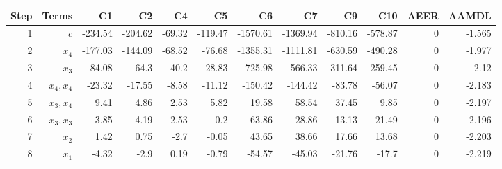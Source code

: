 \begin{tabular}{rrrrrrrrrrrr}
Step & Terms & C1 & C2 & C4 & C5 & C6 & C7 & C9 & C10 & AEER & AAMDL \\ 
\hline 
1 & $c$ & -234.54 & -204.62 & -69.32 & -119.47 & -1570.61 & -1369.94 & -810.16 & -578.87 & 0 & -1.565 \\ 
2 & $x_4$ & -177.03 & -144.09 & -68.52 & -76.68 & -1355.31 & -1111.81 & -630.59 & -490.28 & 0 & -1.977 \\ 
3 & $x_3$ & 84.08 & 64.3 & 40.2 & 28.83 & 725.98 & 566.33 & 311.64 & 259.45 & 0 & -2.12 \\ 
4 & $x_4,x_4$ & -23.32 & -17.55 & -8.58 & -11.12 & -150.42 & -144.42 & -83.78 & -56.07 & 0 & -2.183 \\ 
5 & $x_3,x_4$ & 9.41 & 4.86 & 2.53 & 5.82 & 19.58 & 58.54 & 37.45 & 9.85 & 0 & -2.197 \\ 
6 & $x_3,x_3$ & 3.85 & 4.19 & 2.53 & 0.2 & 63.86 & 28.86 & 13.13 & 21.49 & 0 & -2.196 \\ 
7 & $x_2$ & 1.42 & 0.75 & -2.7 & -0.05 & 43.65 & 38.66 & 17.66 & 13.68 & 0 & -2.203 \\ 
8 & $x_1$ & -4.32 & -2.9 & 0.19 & -0.79 & -54.57 & -45.03 & -21.76 & -17.7 & 0 & -2.219 \\ 
\hline 
\end{tabular}